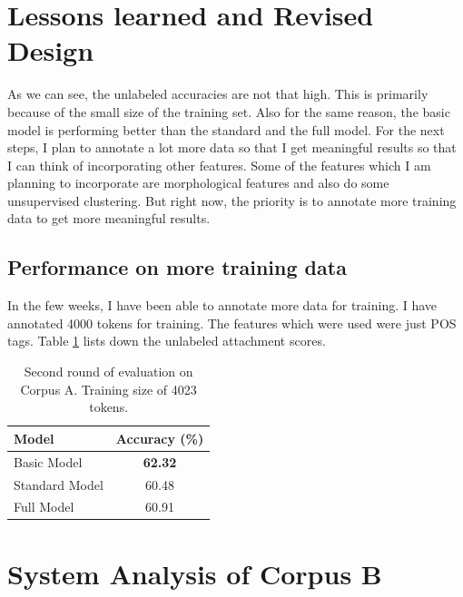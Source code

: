 \documentclass[11pt,letterpaper]{article}
\begin{document}
\section{Lessons learned and Revised Design}
As we can see, the unlabeled accuracies are not that high. This is primarily because of the small size of the training set. Also for the same reason, the basic model is performing better than the standard and the full model. For the next steps, I plan to annotate a lot more data so that I get meaningful results so that I can think of incorporating other features. Some of the features which I am planning to incorporate are morphological features and also do some unsupervised clustering. But right now, the priority is to annotate more training data to get more meaningful results.

\subsection{Performance on more training data}
In the few weeks, I have been able to annotate more data for training. I have annotated 4000 tokens for training. The features which were used were just POS tags. Table \ref{Second} lists down the unlabeled attachment scores. 

\begin{table}
\begin{center}
  \begin{tabular}{ l | c }
  \hline
  Model & Accuracy (\%)\\
  \hline
  Basic Model & \textbf{62.32} \\
  Standard Model & 60.48 \\
  Full Model & 60.91 \\
  \hline
   \end{tabular}
\end{center}
\caption{Second round of evaluation on Corpus A. Training size of 4023 tokens.}
\label{Second}
\end{table}


\section{System Analysis of Corpus B}












 

\newpage




\label{lastpage}
\end{document}
